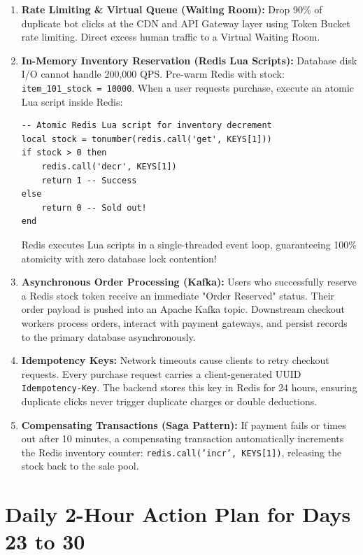\documentclass[10pt,journal,compsoc,onecolumn]{IEEEtran}
\begin{document}
\begin{enumerate}
    \item \textbf{Rate Limiting \& Virtual Queue (Waiting Room):} Drop 90\% of duplicate bot clicks at the CDN and API Gateway layer using Token Bucket rate limiting. Direct excess human traffic to a Virtual Waiting Room.
    \item \textbf{In-Memory Inventory Reservation (Redis Lua Scripts):} Database disk I/O cannot handle 200,000 QPS. Pre-warm Redis with stock: \texttt{item\_101\_stock = 10000}. When a user requests purchase, execute an atomic Lua script inside Redis:
\begin{verbatim}
-- Atomic Redis Lua script for inventory decrement
local stock = tonumber(redis.call('get', KEYS[1]))
if stock > 0 then
    redis.call('decr', KEYS[1])
    return 1 -- Success
else
    return 0 -- Sold out!
end
\end{verbatim}
Redis executes Lua scripts in a single-threaded event loop, guaranteeing 100\% atomicity with zero database lock contention!
    \item \textbf{Asynchronous Order Processing (Kafka):} Users who successfully reserve a Redis stock token receive an immediate "Order Reserved" status. Their order payload is pushed into an Apache Kafka topic. Downstream checkout workers process orders, interact with payment gateways, and persist records to the primary database asynchronously.
    \item \textbf{Idempotency Keys:} Network timeouts cause clients to retry checkout requests. Every purchase request carries a client-generated UUID \texttt{Idempotency-Key}. The backend stores this key in Redis for 24 hours, ensuring duplicate clicks never trigger duplicate charges or double deductions.
    \item \textbf{Compensating Transactions (Saga Pattern):} If payment fails or times out after 10 minutes, a compensating transaction automatically increments the Redis inventory counter: \texttt{redis.call('incr', KEYS[1])}, releasing the stock back to the sale pool.
\end{enumerate}

\section{Daily 2-Hour Action Plan for Days 23 to 30}
\label{sec:action_plan_vol4}
\end{document}
